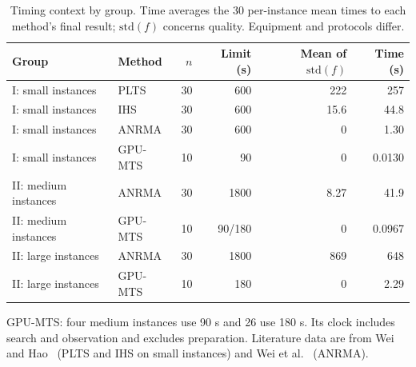 \begin{table}[tbp]\centering\small
\caption{Timing context by group. Time averages the 30 per-instance mean times to each method's final result; $\mathrm{std}(f)$ concerns quality. Equipment and protocols differ.}
\label{tab:literature-timing}
\begin{tabular}{llrrrr}
\toprule
Group & Method & $n$ & Limit (s) & Mean of $\mathrm{std}(f)$ & Time (s)\\
\midrule
I: small instances & PLTS & 30 & 600 & 222 & 257\\
I: small instances & IHS & 30 & 600 & 15.6 & 44.8\\
I: small instances & ANRMA & 30 & 600 & 0 & 1.30\\
I: small instances & GPU-MTS & 10 & 90 & 0 & 0.0130\\
II: medium instances & ANRMA & 30 & 1800 & 8.27 & 41.9\\
II: medium instances & GPU-MTS & 10 & 90/180 & 0 & 0.0967\\
II: large instances & ANRMA & 30 & 1800 & 869 & 648\\
II: large instances & GPU-MTS & 10 & 180 & 0 & 2.29\\
\bottomrule\end{tabular}
\par\smallskip\parbox{.97\linewidth}{\footnotesize GPU-MTS: four medium instances use 90 s and 26 use 180 s. Its clock includes search and observation and excludes preparation. Literature data are from Wei and Hao~\cite{Wei2023IHS} (PLTS and IHS on small instances) and Wei et al.~\cite{Wei2026ANRMA} (ANRMA). }
\end{table}
